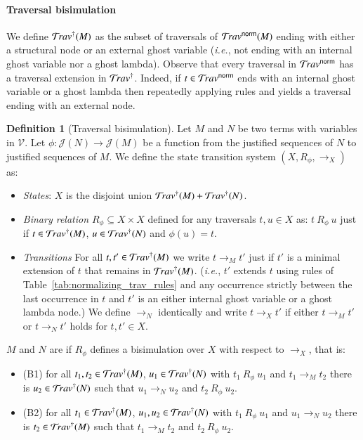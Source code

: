 \documentclass{elsarticle}
\makeatletter
\theoremstyle{plain}
\theoremstyle{definition}
\newtheorem{definition}{Definition}[section]
\theoremstyle{remark}
\newcommand{\normalizing}{{\sf norm}}
\newcommand{\travsetnorm}{\travset^\normalizing}
\renewcommand\ie{{\it i.e.\@\xspace}}
\def\justseqset{\mathcal{J}}
\makeatother
\begin{document}
\paragraph{Traversal bisimulation}

We define $\mathcal{T}\!rav^\dagger(M)$ as the subset of traversals of $\travsetnorm(M)$ ending with either a structural node or an external ghost variable (\ie, not ending with an internal ghost variable nor a ghost lambda).
Observe that every traversal in $\travsetnorm$ has a traversal extension in $\mathcal{T}\!rav^\dagger$.
Indeed, if $t \in \travsetnorm$ ends with an internal ghost variable or a ghost lambda then repeatedly applying
rules  and  yields a traversal ending with an external node.

\begin{definition}[Traversal bisimulation]
\label{def:bisimilar_terms}
Let $M$ and $N$ be two terms with variables in $\mathcal{V}$. Let $\phi\colon \justseqset(N) \rightarrow\justseqset(M)$ be a function from the justified sequences of $N$ to justified sequences of $M$. We define the state transition system $(X, R_\phi, \rightarrow_X)$ as:
\begin{itemize}[nosep]
    \item \emph{States}: $X$ is the disjoint union $\mathcal{T}\!rav^\dagger(M) + \mathcal{T}\!rav^\dagger(N)$.

    \item \emph{Binary relation $R_\phi\subseteq X \times X$} defined for any traversals $t, u \in X$ as:
    $ t~R_\phi~u$ just if $t\in\mathcal{T}\!rav^\dagger(M)$, $u\in\mathcal{T}\!rav^\dagger(N)$ and $\phi(u) = t$.

    \item \emph{Transitions} For all $t, t' \in \mathcal{T}\!rav^\dagger(M)$ we write $t \rightarrow_M t'$ just if $t'$ is a minimal extension of $t$ that remains in $\mathcal{T}\!rav^\dagger(M)$. (\ie, $t'$ extends $t$ using rules of Table~\ref{tab:normalizing_trav_rules} and any occurrence strictly between the last occurrence in $t$ and $t'$ is an either internal ghost variable or a ghost lambda node.) We define $\rightarrow_N$  identically and write $t \rightarrow_X t'$ if either $t \rightarrow_M t'$ or $t \rightarrow_N t'$ holds for $t, t' \in X$.
\end{itemize}

$M$ and $N$ are  if $R_\phi$ defines a bisimulation over $X$ with respect to $\rightarrow_X$, that is:
\begin{itemize}[nosep]
    \item (B1) for all $t_1, t_2 \in \mathcal{T}\!rav^\dagger(M)$, $u_1 \in \mathcal{T}\!rav^\dagger(N)$ with $t_1~R_\phi~u_1$ and $t_1 \rightarrow_M t_2$ there is $u_2 \in \mathcal{T}\!rav^\dagger(N)$ such that $u_1 \rightarrow_N u_2$ and $t_2~R_\phi~u_2$.
    \item (B2) for all $t_1 \in \mathcal{T}\!rav^\dagger(M)$, $u_1, u_2 \in \mathcal{T}\!rav^\dagger(N)$ with $t_1~R_\phi~u_1$ and $u_1 \rightarrow_N u_2$ there is $t_2 \in \mathcal{T}\!rav^\dagger(M)$ such that $t_1 \rightarrow_M t_2$ and $t_2~R_\phi~u_2$.
\end{itemize}
\end{definition}
\end{document}

